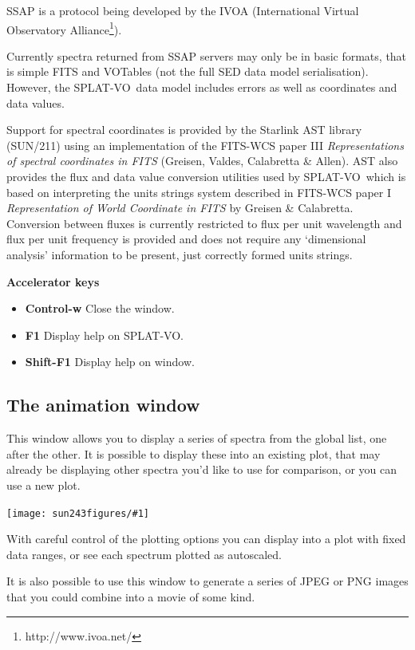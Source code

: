 \documentclass[twoside,11pt]{article}
\newcommand{\htmladdnormallinkfoot}[2]{#1\footnote{#2}}
\newcommand{\htmladdimg}[1]{}
\newcommand{\latexhtml}[2]{#1}
\newcommand{\xref}[3]{#1}
\newcommand{\xlabel}[1]{}
\renewcommand{\_}{\texttt{\symbol{95}}}
\newcommand{\SPLAT}{\textsf{SPLAT-VO}}
\newcommand{\mainfigure}[1]
{\begin{center}
 \latexhtml{\texttt{[image: sun243\_figures/\#1]}}{\htmladdimg{#1.gif}}
 \end{center}
}
\newcommand{\labelitem}[1]{\textbf{#1}}
\newcommand{\subheading}[1]{\textbf{\large{#1}}}
\begin{document}
SSAP is a protocol being developed by the IVOA
(\htmladdnormallinkfoot{International Virtual Observatory Alliance}
{http://www.ivoa.net/}).

Currently spectra returned from SSAP servers may only be in basic formats,
that is simple FITS and VOTables (not the full SED data model serialisation).
However, the \SPLAT\ data model includes errors as well as coordinates and
data values.

Support for spectral coordinates is provided by the Starlink AST library
(\xref{SUN/211}{sun211}{}) using an implementation of the FITS-WCS paper III
\textit{Representations of spectral coordinates in FITS}
(Greisen,
Valdes, Calabretta \& Allen).
AST also provides the flux and data value conversion utilities used by
\SPLAT\ which is based on interpreting the units strings system described
in FITS-WCS paper I \textit{Representation of World Coordinate in FITS}
by Greisen \& Calabretta.
Conversion between fluxes is currently restricted to flux per unit wavelength
and flux per unit frequency is provided and does not require any `dimensional
analysis' information to be present, just correctly formed units strings.

\subheading{Accelerator keys}

\begin{itemize}
\item \labelitem{Control-w} Close the window.
\item \labelitem{F1} Display help on \SPLAT.
\item \labelitem{Shift-F1} Display help on window.
\end{itemize}

\newpage
\subsection{The animation window\xlabel{animation_window}}

This window allows you to display a series of spectra from the global list,
one after the other. It is possible to display these into an existing plot,
that may already be displaying other spectra you'd like to use for comparison,
or you can use a new plot.

\mainfigure{animationwindow}

With careful control of the plotting options you can display into a
plot with fixed data ranges, or see each spectrum plotted as
autoscaled.

It is also possible to use this window to generate a series of JPEG or PNG
images that you could combine into a movie of some kind.
\end{document}
